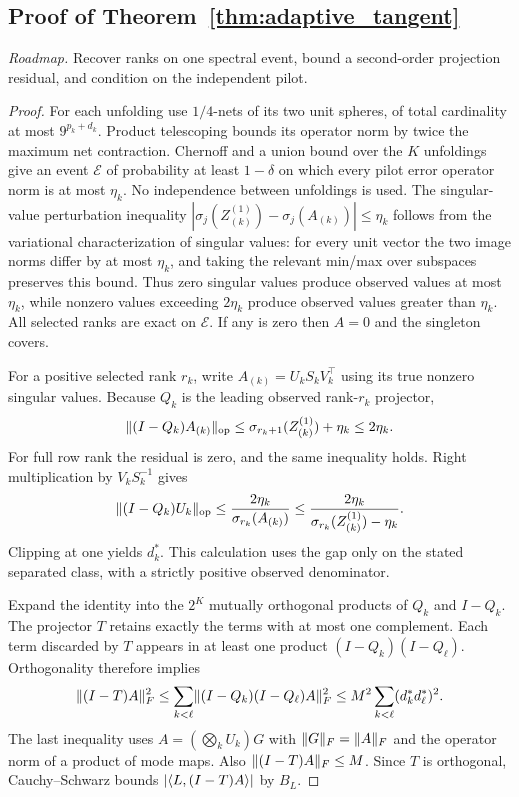 \subsection{Proof of Theorem~\ref{thm:adaptive_tangent}}
\noindent\emph{Roadmap.} Recover ranks on one spectral event, bound a second-order projection residual, and condition on the independent pilot.
\begin{proof}
For each unfolding use $1/4$-nets of its two unit spheres, of total cardinality at most $9^{p_k+d_k}$. Product telescoping bounds its operator norm by twice the maximum net contraction. Chernoff and a union bound over the $K$ unfoldings give an event $\mathcal E$ of probability at least $1-\delta$ on which every pilot error operator norm is at most $\eta_k$. No independence between unfoldings is used.
The singular-value perturbation inequality
$|\sigma_j(Z^{(1)}_{(k)})-\sigma_j(A_{(k)})|\le\eta_k$
follows from the variational characterization of singular values: for every unit vector the two image norms differ by at most $\eta_k$, and taking the relevant min/max over subspaces preserves this bound. Thus zero singular values produce observed values at most $\eta_k$, while nonzero values exceeding $2\eta_k$ produce observed values greater than $\eta_k$. All selected ranks are exact on $\mathcal E$. If any is zero then $A=0$ and the singleton covers.

For a positive selected rank $r_k$, write $A_{(k)}=U_kS_kV_k^\top$ using its true nonzero singular values. Because $Q_k$ is the leading observed rank-$r_k$ projector,
\[
 \lVert (I-Q_k)A_{(k)}\rVert_{\rm op}
 \le\sigma_{r_k+1}(Z^{(1)}_{(k)})+\eta_k\le2\eta_k.
\]
For full row rank the residual is zero, and the same inequality holds. Right multiplication by $V_kS_k^{-1}$ gives
\[
 \lVert (I-Q_k)U_k\rVert_{\rm op}
 \le\frac{2\eta_k}{\sigma_{r_k}(A_{(k)})}
 \le\frac{2\eta_k}{\sigma_{r_k}(Z^{(1)}_{(k)})-\eta_k}.
\]
Clipping at one yields $d_k^*$. This calculation uses the gap only on the stated separated class, with a strictly positive observed denominator.

Expand the identity into the $2^K$ mutually orthogonal products of $Q_k$ and $I-Q_k$. The projector $T$ retains exactly the terms with at most one complement. Each term discarded by $T$ appears in at least one product $(I-Q_k)(I-Q_\ell)$. Orthogonality therefore implies
\[
 \lVert (I-T)A\rVert_F^2
 \le\sum_{k<\ell}\lVert (I-Q_k)(I-Q_\ell)A\rVert_F^2
 \le M^2\sum_{k<\ell}(d_k^*d_\ell^*)^2.
\]
The last inequality uses $A=(\bigotimes_kU_k)G$ with $\lVert G\rVert_F=\lVert A\rVert_F$ and the operator norm of a product of mode maps. Also $\lVert (I-T)A\rVert_F\le M$. Since $T$ is orthogonal, Cauchy--Schwarz bounds
$|\langle L,(I-T)A\rangle|$ by $B_L$.


\end{proof}
